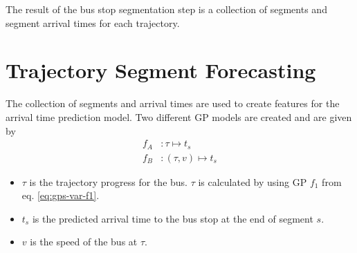 The result of the bus stop segmentation step is a collection of segments and segment arrival times for each trajectory.

\section{Trajectory Segment Forecasting}
The collection of segments and arrival times are used to create features for the arrival time prediction model.
Two different GP models are created and are given by
\begin{align}
    f_A&: \tau \mapsto t_s \label{eq:f_A} \\
    f_B&: (\tau, v) \mapsto t_s \label{eq:f_B}
\end{align}
\begin{itemize}
    \item $\tau$ is the trajectory progress for the bus. $\tau$ is calculated by using GP $f_1$ from eq. \ref{eq:gps-var-f1}.
    \item $t_s$ is the predicted arrival time to the bus stop at the end of segment $s$.
    \item $v$ is the speed of the bus at $\tau$. 
\end{itemize}  

